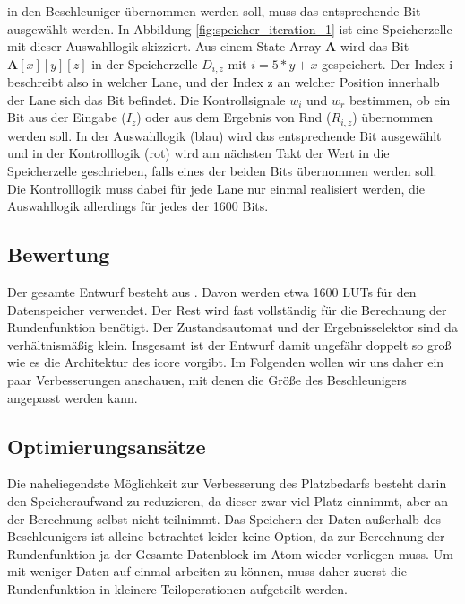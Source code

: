 in den Beschleuniger übernommen werden soll, muss das entsprechende Bit ausgewählt werden. In Abbildung \ref{fig:speicher_iteration_1} ist eine Speicherzelle
mit dieser Auswahllogik skizziert. Aus einem State Array $\textbf{A}$ wird das Bit $\textbf{A}[x][y][z]$ in der Speicherzelle $D_{i,z}$ mit $i = 5 * y + x$ gespeichert.
Der Index i beschreibt also in welcher Lane, und der Index z an welcher Position innerhalb der Lane sich das Bit befindet. Die Kontrollsignale $w_i$ und $w_r$ bestimmen,
ob ein Bit aus der Eingabe ($I_z$) oder aus dem Ergebnis von Rnd ($R_{i,z}$) übernommen werden soll. In der Auswahllogik (blau) wird das entsprechende Bit ausgewählt und in der
Kontrolllogik (rot) wird am nächsten Takt der Wert in die Speicherzelle geschrieben, falls eines der beiden Bits übernommen werden soll.
Die Kontrolllogik muss dabei für jede Lane nur einmal realisiert werden, die Auswahllogik allerdings für jedes der 1600 Bits. 

\subsection{Bewertung}
Der gesamte Entwurf besteht aus . Davon werden etwa 1600 LUTs für den Datenspeicher verwendet.
Der Rest wird fast vollständig für die Berechnung der Rundenfunktion benötigt. Der Zustandsautomat und der Ergebnisselektor sind da verhältnismäßig klein.
Insgesamt ist der Entwurf damit ungefähr doppelt so groß wie es die Architektur des icore vorgibt. Im Folgenden wollen wir uns daher ein paar Verbesserungen anschauen,
mit denen die Größe des Beschleunigers angepasst werden kann.

\subsection{Optimierungsansätze}
\label{cha:iteration_1_optimierungen}
Die naheliegendste Möglichkeit zur Verbesserung des Platzbedarfs besteht darin den Speicheraufwand zu reduzieren, da dieser zwar viel Platz einnimmt,
aber an der Berechnung selbst nicht teilnimmt. Das Speichern der Daten außerhalb des Beschleunigers ist alleine betrachtet leider keine Option, da zur Berechnung der Rundenfunktion
ja der Gesamte Datenblock im Atom wieder vorliegen muss. Um mit weniger Daten auf einmal arbeiten zu können, muss daher zuerst die Rundenfunktion in kleinere
Teiloperationen aufgeteilt werden.

